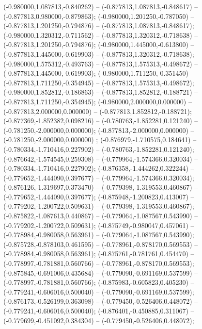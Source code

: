  (-0.980000,1.087813,-0.840262) -- (-0.877813,1.087813,-0.848617) -- (-0.877813,0.980000,-0.879863);
 (-0.980000,1.201250,-0.787050) -- (-0.877813,1.201250,-0.794876) -- (-0.877813,1.087813,-0.848617);
 (-0.980000,1.320312,-0.711562) -- (-0.877813,1.320312,-0.718638) -- (-0.877813,1.201250,-0.794876);
 (-0.980000,1.445000,-0.613800) -- (-0.877813,1.445000,-0.619903) -- (-0.877813,1.320312,-0.718638);
 (-0.980000,1.575312,-0.493763) -- (-0.877813,1.575313,-0.498672) -- (-0.877813,1.445000,-0.619903);
 (-0.980000,1.711250,-0.351450) -- (-0.877813,1.711250,-0.354945) -- (-0.877813,1.575313,-0.498672);
 (-0.980000,1.852812,-0.186863) -- (-0.877813,1.852812,-0.188721) -- (-0.877813,1.711250,-0.354945);
 (-0.980000,2.000000,0.000000) -- (-0.877813,2.000000,0.000000) -- (-0.877813,1.852812,-0.188721);
 (-0.877369,-1.852382,0.098216) -- (-0.780763,-1.852281,0.121240) -- (-0.781250,-2.000000,0.000000);
 (-0.877813,-2.000000,0.000000) -- (-0.781250,-2.000000,0.000000) ;
 (-0.876979,-1.710575,0.184641) -- (-0.780334,-1.710416,0.227902) -- (-0.780763,-1.852281,0.121240);
 (-0.876642,-1.574545,0.259308) -- (-0.779964,-1.574366,0.320034) -- (-0.780334,-1.710416,0.227902);
 (-0.876358,-1.444262,0.322244) -- (-0.779652,-1.444090,0.397677) -- (-0.779964,-1.574366,0.320034);
 (-0.876126,-1.319697,0.373470) -- (-0.779398,-1.319553,0.460867) -- (-0.779652,-1.444090,0.397677);
 (-0.875948,-1.200823,0.413007) -- (-0.779202,-1.200722,0.509631) -- (-0.779398,-1.319553,0.460867);
 (-0.875822,-1.087613,0.440867) -- (-0.779064,-1.087567,0.543990) -- (-0.779202,-1.200722,0.509631);
 (-0.875749,-0.980047,0.457061) -- (-0.778984,-0.980058,0.563961) -- (-0.779064,-1.087567,0.543990);
 (-0.875728,-0.878103,0.461595) -- (-0.778961,-0.878170,0.569553) -- (-0.778984,-0.980058,0.563961);
 (-0.875761,-0.781761,0.454470) -- (-0.778997,-0.781881,0.560766) -- (-0.778961,-0.878170,0.569553);
 (-0.875845,-0.691006,0.435684) -- (-0.779090,-0.691169,0.537599) -- (-0.778997,-0.781881,0.560766);
 (-0.875983,-0.605823,0.405230) -- (-0.779241,-0.606016,0.500040) -- (-0.779090,-0.691169,0.537599);
 (-0.876173,-0.526199,0.363098) -- (-0.779450,-0.526406,0.448072) -- (-0.779241,-0.606016,0.500040);
 (-0.876401,-0.450885,0.311067) -- (-0.779699,-0.451092,0.384304) -- (-0.779450,-0.526406,0.448072);
